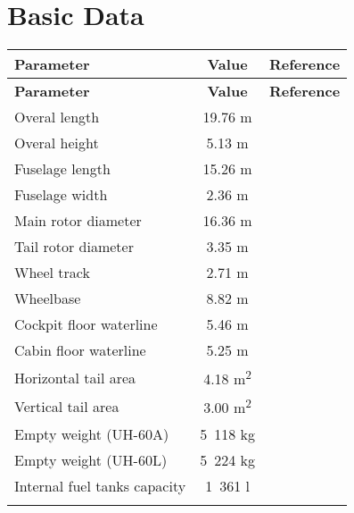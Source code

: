 \section{Basic Data}

\begin{tabularx}{\textwidth}{ | L | c | c | }
  \hline
  \textbf{Parameter}                    & \textbf{Value}   & \textbf{Reference} \\ \hline
  \endfirsthead
  \hline
  \textbf{Parameter}                    & \textbf{Value}   & \textbf{Reference} \\ \hline
  \endhead
  Overal length                         & 19.76 m          &  \cite{Janes20042005,NASA-CR-166309} \\ \hline
  Overal height                         & 5.13 m           &  \cite{Janes20042005} \\ \hline
  Fuselage length                       & 15.26 m          & \cite{Janes20042005,NASA-CR-166309} \\ \hline
  Fuselage width                        & 2.36 m           & \cite{UH60_OperatorsManual,Janes20042005} \\ \hline
  Main rotor diameter                   & 16.36 m          & \cite{Janes20042005,UH60_OperatorsManual} \\ \hline
  Tail rotor diameter                   & 3.35 m           & \cite{Janes20042005,UH60_OperatorsManual} \\ \hline
  Wheel track                           & 2.71 m           & \cite{Janes20042005,NASA-CR-166309} \\ \hline
  Wheelbase                             & 8.82 m           & \cite{Janes20042005,NASA-CR-166309} \\ \hline
  Cockpit floor waterline               & 5.46 m           & \cite{UH60_MaintenanceManual} \\ \hline
  Cabin floor waterline                 & 5.25 m           & \cite{UH60_MaintenanceManual} \\ \hline
  Horizontal tail area                  & 4.18 m\textsuperscript{2} & \cite{Janes20042005,NASA-CR-166309} \\ \hline
  Vertical tail area                    & 3.00 m\textsuperscript{2} & \cite{Janes20042005,NASA-CR-166309} \\ \hline
  Empty weight (UH-60A)                 & 5~118 kg         & \cite{Janes20042005} \\ \hline
  Empty weight (UH-60L)                 & 5~224 kg         & \cite{Janes20042005} \\ \hline
  Internal fuel tanks capacity          & 1~361 l          & \cite{Janes20042005,UH60_OperatorsManual} \\ \hline
  \caption{Basic data}
\end{tabularx}

